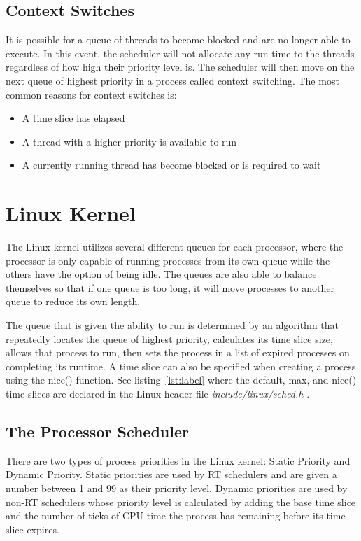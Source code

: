 \documentclass[10pt, draftclsnofoot,onecolumn]{IEEEtran}
\begin{document}
\subsection{Context Switches}

It is possible for a queue of threads to become blocked and are no longer able to execute. In this event, the scheduler will not allocate any run time to the threads regardless of how high their priority level is. The scheduler will then move on the next queue of highest priority in a process called context switching. The most common reasons for context switches is: 
	\begin{itemize}
	  \item A time slice has elapsed
      \item A thread with a higher priority is available to run
      \item A currently running thread has become blocked or is required to wait
	\end{itemize}

\section{Linux Kernel}

The Linux kernel utilizes several different queues for each processor, where the processor is only capable of running processes from its own queue while the others have the option of being idle. The queues are also able to balance themselves so that if one queue is too long, it will move processes to another queue to reduce its own length. \par 
The queue that is given the ability to run is determined by an algorithm that repeatedly locates the queue of highest priority, calculates its time slice size, allows that process to run, then sets the process in a list of expired processes on completing its runtime. A time slice can also be specified when creating a process using the nice() function. See listing~\ref{lst:label} where the default, max, and nice() time slices are declared in the Linux header file \textit{include/linux/sched.h} \cite{2}.

\subsection{The Processor Scheduler}

There are two types of process priorities in the Linux kernel: Static Priority and Dynamic Priority. Static priorities are used by RT schedulers and are given a number between 1 and 99 as their priority level. Dynamic priorities are used by non-RT schedulers whose priority level is calculated by adding the base time slice and the number of ticks of CPU time the process has remaining before its time slice expires.
\end{document}
